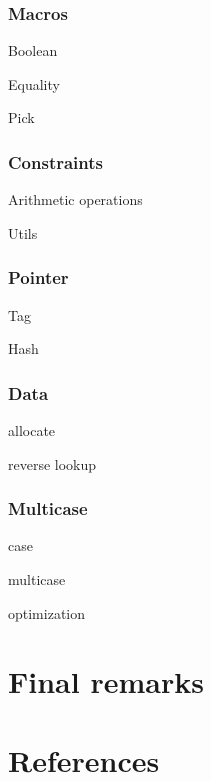 \documentclass[10pt, english]{article}
\begin{document}
\subsubsection{Macros}

Boolean

Equality

Pick

\subsubsection{Constraints}

Arithmetic operations

Utils

\subsubsection{Pointer}

Tag

Hash

\subsubsection{Data}

allocate

reverse lookup

\subsubsection{Multicase}

case

multicase

optimization


\section{Final remarks}

\section{References}




\end{document}
